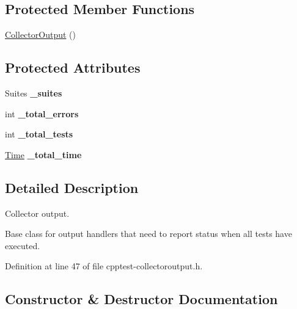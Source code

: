 \subsection*{Protected Member Functions}
\begin{DoxyCompactItemize}
\item 
\hyperlink{class_test_1_1_collector_output_a852bde8f194b4f81ca36f222257adc53}{Collector\+Output} ()
\end{DoxyCompactItemize}
\subsection*{Protected Attributes}
\begin{DoxyCompactItemize}
\item 
Suites {\bfseries \+\_\+suites}\hypertarget{class_test_1_1_collector_output_a9f79c0fa5abf1d6248a85e7ae4701c5f}{}\label{class_test_1_1_collector_output_a9f79c0fa5abf1d6248a85e7ae4701c5f}

\item 
int {\bfseries \+\_\+total\+\_\+errors}\hypertarget{class_test_1_1_collector_output_a7d8ec4ad0316b57aa96ae50a548c94d2}{}\label{class_test_1_1_collector_output_a7d8ec4ad0316b57aa96ae50a548c94d2}

\item 
int {\bfseries \+\_\+total\+\_\+tests}\hypertarget{class_test_1_1_collector_output_ace6c1fc02a6ac7a6c15b982b96f5f68f}{}\label{class_test_1_1_collector_output_ace6c1fc02a6ac7a6c15b982b96f5f68f}

\item 
\hyperlink{class_test_1_1_time}{Time} {\bfseries \+\_\+total\+\_\+time}\hypertarget{class_test_1_1_collector_output_af1e014fde4bf5b4e6c89de748630aa79}{}\label{class_test_1_1_collector_output_af1e014fde4bf5b4e6c89de748630aa79}

\end{DoxyCompactItemize}


\subsection{Detailed Description}
Collector output. 

Base class for output handlers that need to report status when all tests have executed. 

Definition at line 47 of file cpptest-\/collectoroutput.\+h.



\subsection{Constructor \& Destructor Documentation}
